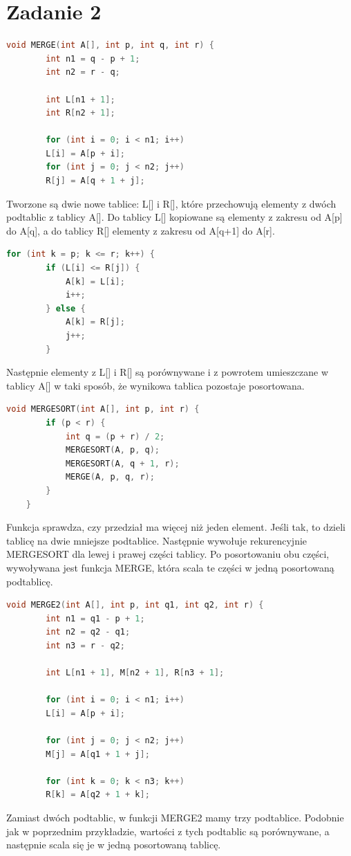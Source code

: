 \documentclass{article}
\begin{document}
	\newpage
	\section*{Zadanie 2}
	\begin{lstlisting}[language=C++, tabsize=3]
	void MERGE(int A[], int p, int q, int r) {
		int n1 = q - p + 1;
		int n2 = r - q;
		
		int L[n1 + 1];
		int R[n2 + 1];
		
		for (int i = 0; i < n1; i++)
		L[i] = A[p + i];
		for (int j = 0; j < n2; j++)
		R[j] = A[q + 1 + j];
	\end{lstlisting}
	Tworzone są dwie nowe tablice: L[] i R[], które przechowują elementy z dwóch podtablic z tablicy A[]. Do tablicy L[] kopiowane są elementy z zakresu od A[p] do A[q], a do tablicy R[] elementy z zakresu od A[q+1] do A[r].
	\begin{lstlisting}[language=C++, tabsize=3]
	for (int k = p; k <= r; k++) {
		if (L[i] <= R[j]) {
			A[k] = L[i];
			i++;
		} else {
			A[k] = R[j];
			j++;
		}
	\end{lstlisting}
	Następnie elementy z L[] i R[] są porównywane i z powrotem umieszczane w tablicy A[] w taki sposób, że wynikowa tablica pozostaje posortowana.
	\begin{lstlisting}[language=C++, tabsize=3]
	void MERGESORT(int A[], int p, int r) {
		if (p < r) {
			int q = (p + r) / 2;
			MERGESORT(A, p, q);
			MERGESORT(A, q + 1, r);
			MERGE(A, p, q, r);
		}
	}
	\end{lstlisting}
	Funkcja sprawdza, czy przedział ma więcej niż jeden element. Jeśli tak, to dzieli tablicę na dwie mniejsze podtablice. Następnie wywołuje rekurencyjnie MERGESORT dla lewej i prawej części tablicy. Po posortowaniu obu części, wywoływana jest funkcja MERGE, która scala te części w jedną posortowaną podtablicę.
	\begin{lstlisting}[language=C++, tabsize=3]
	void MERGE2(int A[], int p, int q1, int q2, int r) {
		int n1 = q1 - p + 1;
		int n2 = q2 - q1;
		int n3 = r - q2;
		
		int L[n1 + 1], M[n2 + 1], R[n3 + 1];
		
		for (int i = 0; i < n1; i++)
		L[i] = A[p + i];
		
		for (int j = 0; j < n2; j++)
		M[j] = A[q1 + 1 + j];
		
		for (int k = 0; k < n3; k++)
		R[k] = A[q2 + 1 + k];
	\end{lstlisting}
	Zamiast dwóch podtablic, w funkcji MERGE2 mamy trzy podtablice. Podobnie jak w poprzednim przykładzie, wartości z tych podtablic są porównywane, a następnie scala się je w jedną posortowaną tablicę.
\end{document}
